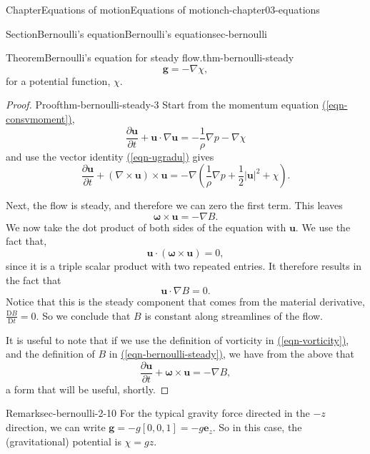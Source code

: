 \documentclass[oneside,10pt,]{book}
\newcommand{\xreffont}{\relax}
\numberwithin{equation}{section}
\newcommand{\DD}[2]{\frac{\mathrm{D}#1}{\mathrm{D}#2}}
\newcommand{\pd}[2]{\frac{\partial#1}{\partial#2}}
\newcommand{\be}{\boldsymbol{e}}
\newcommand{\bu}{\boldsymbol{u}}
\newcommand{\bg}{\boldsymbol{g}}
\newcommand{\bomega}{\boldsymbol{\omega}}
\begin{document}
\begin{chapterptx}{Chapter}{Equations of motion}{}{Equations of motion}{}{}{ch-chapter03-equations}
\begin{sectionptx}{Section}{Bernoulli's equation}{}{Bernoulli's equation}{}{}{sec-bernoulli}
\begin{introduction}{}
\begin{theorem}{Theorem}{Bernoulli's equation for steady flow.}{}{thm-bernoulli-steady}
\begin{equation}
\bg = -\nabla \chi, \label{eqn-gravity-potential}
\end{equation}
for a potential function, \(\chi\).%
\end{theorem}
\begin{proof}{Proof}{}{thm-bernoulli-steady-3}
Start from the momentum equation \hyperref[eqn-consvmoment]{({\xreffont\ref{eqn-consvmoment}})},%
\begin{equation*}
\pd{\bu}{t} + \bu \cdot \nabla\bu = - \frac{1}{\rho}\nabla p - \nabla \chi
\end{equation*}
and use the vector identity \hyperref[eqn-ugradu]{({\xreffont\ref{eqn-ugradu}})} gives%
\begin{equation*}
\pd{\bu}{t} + (\nabla \times \bu) \times \bu = - \nabla \left(\frac{1}{\rho}\nabla p + \frac{1}{2} |\bu|^2 + \chi\right).
\end{equation*}
%
\par
Next, the flow is steady, and therefore we can zero the first term. This leaves%
\begin{equation*}
\bomega \times \bu = -\nabla B.
\end{equation*}
We now take the dot product of both sides of the equation with \(\bu\). We use the fact that,%
\begin{equation*}
\bu \cdot (\bomega \times \bu ) = 0,
\end{equation*}
since it is a triple scalar product with two repeated entries. It therefore results in the fact that%
\begin{equation*}
\bu \cdot \nabla B = 0.
\end{equation*}
Notice that this is the steady component that comes from the material derivative, \(\DD{B}{t} = 0\). So we conclude that \(B\) is constant along streamlines of the flow.%
\par
It is useful to note that if we use the definition of vorticity in \hyperref[eqn-vorticity]{({\xreffont\ref{eqn-vorticity}})}, and the definition of \(B\) in \hyperref[eqn-bernoulli-steady]{({\xreffont\ref{eqn-bernoulli-steady}})}, we have from the above that%
\begin{equation}
\pd{\bu}{t} + \bomega \times \bu = -\nabla B,\label{eqn-bernoulli-vorticity}
\end{equation}
a form that will be useful, shortly.%
\end{proof}
\begin{remark}{Remark}{}{sec-bernoulli-2-10}%
For the typical gravity force directed in the \(-z\) direction, we can write \(\bg = -g[0, 0, 1] = -g \be_z\). So in this case, the (gravitational) potential is \(\chi = gz\).%

\end{remark}
\end{introduction}
\end{sectionptx}
\end{chapterptx}
\end{document}
